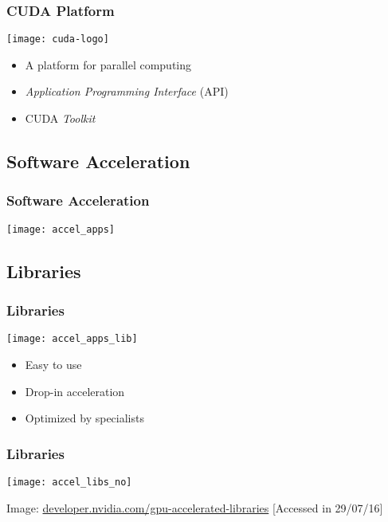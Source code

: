\documentclass[10pt, compress]{beamer}
\begin{document}
\begin{frame}
    \frametitle{CUDA Platform}
    \begin{center}
        \texttt{[image: cuda-logo]}
    \end{center}


    \begin{itemize}
        \item A platform for \alert{parallel computing}
        \item \textit{Application Programming Interface} (API)
        \item CUDA \textit{Toolkit}
    \end{itemize}
\end{frame}

\subsection{Software Acceleration}

\begin{frame}
    \frametitle{Software Acceleration}
    \centering
    \texttt{[image: accel\_apps]}
\end{frame}

\subsection{Libraries}

\begin{frame}
    \frametitle{Libraries}
    \begin{center}
        \texttt{[image: accel\_apps\_lib]}
    \end{center}


    \begin{itemize}
        \item Easy to use

        \item \alert{Drop-in} acceleration

        \item Optimized by specialists
    \end{itemize}
\end{frame}

\begin{frame}
    \frametitle{Libraries}
    \centering
    \texttt{[image: accel\_libs\_no]}
    \vfill

    \tiny{Image: \url{developer.nvidia.com/gpu-accelerated-libraries} [Accessed in 29/07/16]}
\end{frame}
\end{document}
